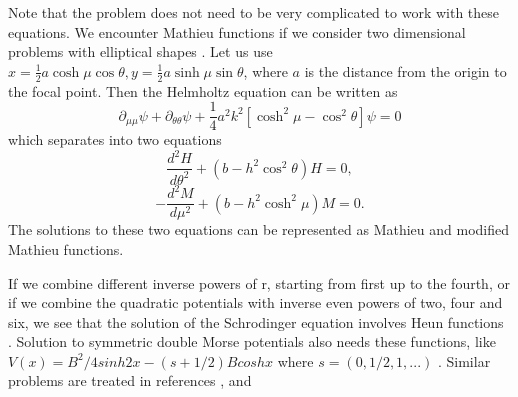 \documentclass{article}
\begin{document}
\noindent Note that the problem does not need to be very
complicated to work with these equations. We encounter Mathieu
functions if we consider two dimensional problems with elliptical
shapes \cite{Morse3}. Let us use $ x= \frac{1}{2} a \cosh {\mu}
\cos{\theta}, y= \frac{1}{2} a \sinh {\mu} \sin{\theta}$, where
$a$ is the distance from the origin to the focal point. Then the
Helmholtz equation can be written as
\begin{equation}
{ \partial_{\mu \mu} \psi} + {
\partial_{\theta \theta} \psi} + \frac{1}{4} a^2 k^2 [
\cosh^2 {\mu} - \cos^2 {\theta} ] \psi=0
\end{equation}
which separates into two equations
\begin{equation}
\frac { d^2 H}{ d \theta^2} +( b - h^2 \cos^2{ \theta}) H =0,
\end{equation}
\begin{equation}
-\frac { d^2 M}{ d \mu^2} +( b - h^2 \cosh^2{ \mu}) M =0.
\end{equation}
The solutions to these two equations can be represented as Mathieu
and modified Mathieu functions.

\noindent If we combine different inverse powers of r, starting
from first up to the fourth, or if we combine the quadratic
potentials with inverse even powers of two, four and six, we see
that the solution of the Schrodinger equation involves Heun
functions \cite{bonorino4}. Solution to symmetric double Morse
potentials also needs these functions, like $ V ( x) = B^2 /4
sinh2 x - (s+ 1/2) B cosh x $ where $s= (0,1/2, 1,...)$
\cite{bonorino4}. Similar problems are treated in references
\cite{bonorino1}, \cite{bonorino2} and \cite{bonorino3}
\end{document}
